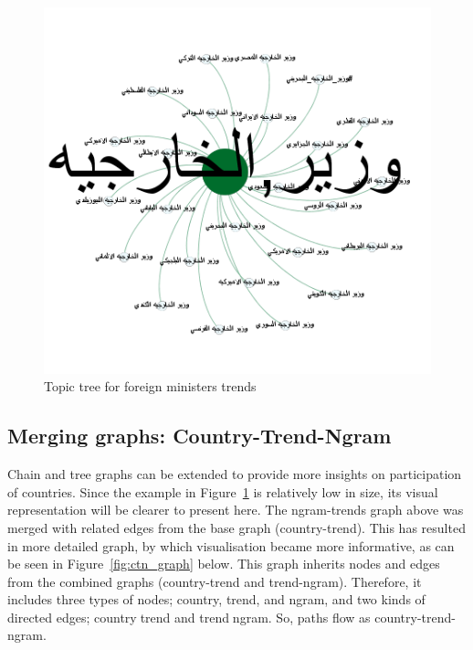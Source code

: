 \documentclass[conference]{IEEEtran}
\begin{document}
{\begin{figure}[htb] \centering
\includegraphics[width=\columnwidth]{images/foreign_ministers_tree.png}
\caption{Topic tree for foreign ministers trends}
\label{fig:ministers_tree}
\end{figure}

\subsection{Merging graphs: Country-Trend-Ngram}

Chain and tree graphs can be extended to provide more insights on participation 
of countries. Since the example in Figure~\ref{fig:ministers_tree} is relatively low in size, its visual 
representation will be clearer to present here. The ngram-trends graph above 
was merged with related edges from the base graph (country-trend). 
This has resulted in more detailed graph, by which visualisation became more 
informative, as can be seen in Figure~\ref{fig:ctn_graph} below. This graph inherits nodes and 
edges from the combined graphs (country-trend and trend-ngram). Therefore, 
it includes three types of nodes; country, trend, and ngram, and two kinds of 
directed edges; countrytrend and trendngram. So, paths flow as country-trend-ngram. 

}
\end{document}
